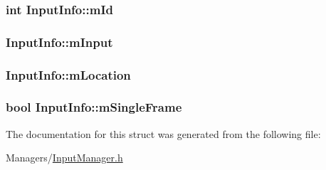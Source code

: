 \subsubsection[{\texorpdfstring{m\+Id}{mId}}]{\setlength{\rightskip}{0pt plus 5cm}int Input\+Info\+::m\+Id}\hypertarget{structInputInfo_aa9a747ebf019888e0a23cdfff3dbbce6}{}\label{structInputInfo_aa9a747ebf019888e0a23cdfff3dbbce6}
\subsubsection[{\texorpdfstring{m\+Input}{mInput}}]{ Input\+Info\+::m\+Input}\hypertarget{structInputInfo_ab717d6336deb41d9624d65ba8c95abd8}{}\label{structInputInfo_ab717d6336deb41d9624d65ba8c95abd8}
\subsubsection[{\texorpdfstring{m\+Location}{mLocation}}]{ Input\+Info\+::m\+Location}\hypertarget{structInputInfo_aeb13d259ccdadc3d60bc5711ac23aa35}{}\label{structInputInfo_aeb13d259ccdadc3d60bc5711ac23aa35}
\subsubsection[{\texorpdfstring{m\+Single\+Frame}{mSingleFrame}}]{\setlength{\rightskip}{0pt plus 5cm}bool Input\+Info\+::m\+Single\+Frame}\hypertarget{structInputInfo_a2522512a2247f8595e4161c52a83efdb}{}\label{structInputInfo_a2522512a2247f8595e4161c52a83efdb}


The documentation for this struct was generated from the following file\+:\begin{DoxyCompactItemize}
\item 
Managers/\hyperlink{InputManager_8h}{Input\+Manager.\+h}\end{DoxyCompactItemize}
